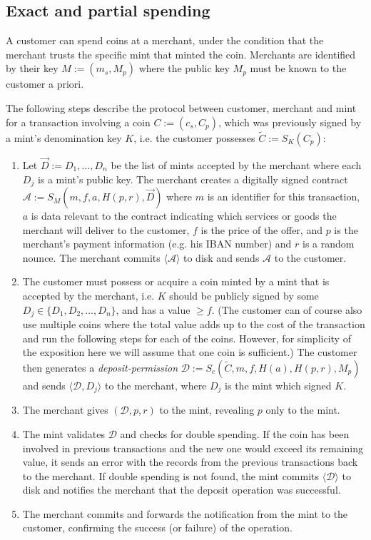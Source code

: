 \documentclass{llncs}
\begin{document}
\subsection{Exact and partial spending}

A customer can spend coins at a merchant, under the condition that the
merchant trusts the specific mint that minted the coin.  Merchants are
identified by their key $M := (m_s, M_p)$ where the public key $M_p$
must be known to the customer a priori.

The following steps describe the protocol between customer, merchant and mint
for a transaction involving a coin $C := (c_s, C_p)$, which was previously signed
by a mint's denomination key $K$, i.e. the customer possesses
$\widetilde{C} := S_K(C_p)$:

\begin{enumerate}
\item\label{contract} Let $\vec{D} := D_1, \ldots, D_n$ be the list of
  mints accepted by the merchant where each $D_j$ is a mint's public
  key.  The merchant creates a digitally signed contract $\mathcal{A}
  := S_M(m, f, a, H(p, r), \vec{D})$ where $m$ is an identifier for this
  transaction, $a$ is data relevant to the contract indicating which services
  or goods the merchant will deliver to the customer, $f$ is the price of the offer,
  and $p$ is the merchant's payment information (e.g. his IBAN number) and $r$ is
  a random nounce.  The merchant commits $\langle \mathcal{A}
  \rangle$ to disk and sends $\mathcal{A}$ to the customer.
\item\label{deposit} The customer must possess or acquire a coin minted by a mint that is
  accepted by the merchant, i.e. $K$ should be publicly signed by some $D_j
  \in \{D_1, D_2, \ldots, D_n\}$, and has a value $\geq f$. (The customer
  can of course also use multiple coins where the total value adds up to
  the cost of the transaction and run the following steps for each of
  the coins. However, for simplicity of the exposition here we will
  assume that one coin is sufficient.)
%
  The customer then generates a \emph{deposit-permission} $\mathcal{D} :=
  S_c(\widetilde{C}, m, f, H(a), H(p,r), M_p)$
  and sends $\langle \mathcal{D}, D_j\rangle$ to the merchant,
  where $D_j$ is the mint which signed $K$.
\item The merchant gives $(\mathcal{D}, p, r)$ to the mint, revealing $p$
  only to the mint.

\item The mint validates $\mathcal{D}$ and checks for double spending.
  If the coin has been involved in previous transactions and the new
  one would exceed its remaining value, it sends an error
  with the records from the previous transactions back to the merchant.
%
  If double spending is not found, the mint commits $\langle \mathcal{D} \rangle$ to disk
  and notifies the merchant that the deposit operation was successful.

\item The merchant commits and forwards the notification from the mint to the
  customer, confirming the success (or failure) of the operation.
\end{enumerate}
\end{document}
